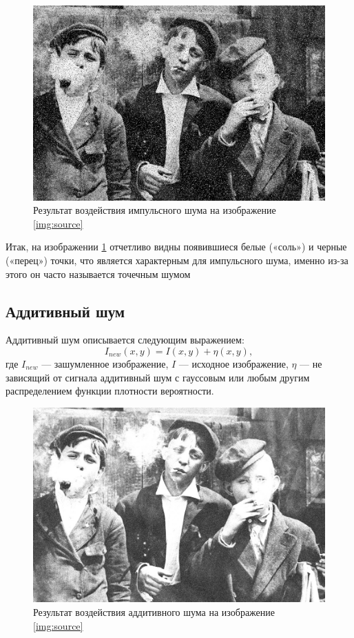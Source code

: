 \begin{figure}[ht!]
    \centering
    \includegraphics[width=\textwidth]{../Noisy_images/Impulse_noise.jpg}
    \caption{Результат воздействия импульсного шума на изображение \ref{img:source}}
    \label{img:impulse_noise}  
\end{figure}
\FloatBarrier

Итак, на изображении \ref{img:impulse_noise} отчетливо видны появившиеся белые («соль») и черные («перец») точки, что является характерным для импульсного шума, именно из-за этого он часто называется точечным шумом

\subsection{Аддитивный шум}
Аддитивный шум описывается следующим выражением:
\begin{equation}
    I_{new}(x,y) = I(x,y)  + \eta(x,y),
\end{equation}
где $ I_{new}$ — зашумленное изображение, $I$ — исходное изображение, $\eta$ — не зависящий от сигнала аддитивный шум с гауссовым или любым другим распределением функции плотности вероятности.

\begin{figure}[ht!]
    \centering
    \includegraphics[width=\textwidth]{../Noisy_images/Additive_noise.jpg}
    \caption{Результат воздействия аддитивного шума на изображение \ref{img:source}}
    \label{img:additive_noise}
\end{figure}
\FloatBarrier

